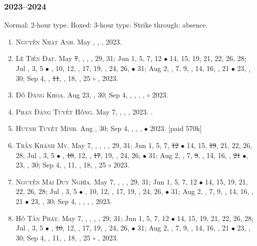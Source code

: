 \documentclass{article}
\begin{document}
\subsubsection{2023--2024}
Normal: 2-hour type. Boxed: 3-hour type. Strike through: absence.
\begin{enumerate}
	\item \textsc{Nguyễn Nhật Anh.} {\sf[In]} May , , , 2023. {\sf[Out]}
	\item \textsc{Lê Tiến Đạt.} May \st{7}, , , , 29, 31; Jun 1, 5, 7, 12 $\bullet$ 14, 15, 19, 21, 22, 26, 28; Jul , 3, 5 $\bullet$ , 10, 12, , 17, 19, , 24, 26,  $\bullet$ 31; Aug 2, , 7, 9, , 14, 16, , 21 $\bullet$ 23, , 30; Sep 4, , \st{11}, , 18, , 25 $\circ$ , 2023.
	\item \textsc{Đỗ Đăng Khoa.} {\sf[In]} Aug 23, , 30; Sep 4, , , , , $\circ$ 2023.
	\item \textsc{Phan Đặng Tuyết Hồng.} May 7, , , , 2023. {}. {\sf[Out]}
	\item \textsc{Huỳnh Tuyết Minh.} {\sf[In]} Aug , 30; Sep 4, , , ,  $\bullet$ 2023. [paid 570k]
	\item \textsc{Trần Khánh My.} May 7, , , , , 29, 31; Jun 1, 5, 7, \st{12} $\bullet$ 14, 15, \st{19}, 21, 22, 26, 28; Jul , 3, 5 $\bullet$ , \st{10}, 12, , \st{17}, 19, , 24, 26,  $\bullet$ 31; Aug 2, , 7, \st{9}, , 14, 16, , \st{21} $\bullet$, 23, , 30; Sep 4, , 11, , 18, , 25 $\circ$  2023.
	\item \textsc{Nguyễn Mai Duy Nghĩa.} May 7, , , , 29, 31; Jun 1, 5, 7, 12 $\bullet$ 14, 15, 19, 21, 22, 26, 28; Jul , 3, 5 $\bullet$ , 10, 12, , 17, 19, , 24, 26,  $\bullet$ 31; Aug 2, , 7, 9, , 14, 16, , 21 $\bullet$ 23, , 30; Sep 4, , , , , 2023.
	\item \textsc{Hồ Tấn Phát.} May 7, , , , , 29, 31; Jun 1, 5, 7, 12 $\bullet$ 14, 15, 19, 21, 22, 26, 28; Jul , 3, 5 $\bullet$ , \st{10}, 12, , 17, 19, , 24, 26,  $\bullet$ 31; Aug 2, , 7, 9, , 14, 16, , 21 $\bullet$ 23, , 30; Sep 4, , 11, , 18, , 25 $\circ$ , 2023.

\end{enumerate}
\end{document}
